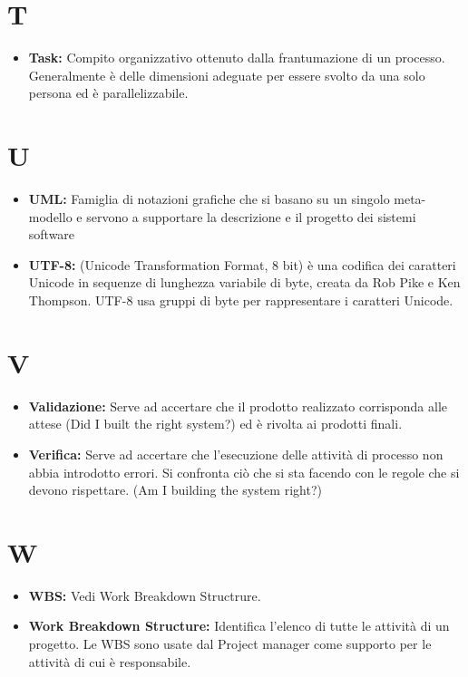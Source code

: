\documentclass[a4paper]{article}
\begin{document}
	\section{T}
		\begin{itemize}	
			\item \textbf{Task:} Compito organizzativo ottenuto dalla frantumazione di un processo. Generalmente è delle 
			dimensioni adeguate per essere svolto da una solo persona ed è parallelizzabile.
		\end{itemize}
		
	\section{U}
		\begin{itemize}	
			\item \textbf{UML:} Famiglia di notazioni grafiche che si basano su un singolo meta-modello e servono a supportare la 
			descrizione e il progetto dei sistemi software	
			\item \textbf{UTF-8:} (Unicode Transformation Format, 8 bit) è una codifica dei caratteri Unicode in sequenze 
			di lunghezza variabile di byte, creata da Rob Pike e Ken Thompson. UTF-8 usa gruppi di byte per rappresentare i caratteri Unicode.		
		\end{itemize}
		
	\section{V}
		\begin{itemize}
			\item \textbf{Validazione:} Serve ad accertare che il prodotto realizzato corrisponda alle attese (Did I 
			built the right system?) ed è rivolta ai prodotti finali.
			\item \textbf{Verifica:} Serve ad accertare che l’esecuzione delle attività di processo non abbia introdotto 
			errori. Si confronta ciò che si sta facendo con le regole che si devono rispettare. (Am I building the system right?)	
		\end{itemize}
		
	\section{W}
		\begin{itemize}
			\item \textbf{WBS:} Vedi Work Breakdown Structrure.
			\item \textbf{Work Breakdown Structure:} Identifica l'elenco di tutte le attività di un progetto. Le WBS sono 
			usate dal Project manager come supporto per le attività di cui è responsabile.
		\end{itemize}
\end{document}
